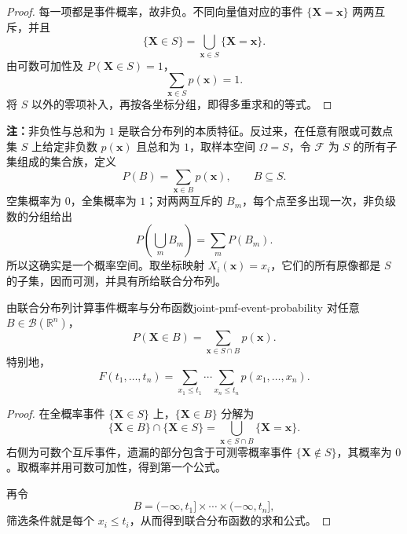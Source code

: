 \begin{proof}
每一项都是事件概率，故非负。不同向量值对应的事件 $\{\boldsymbol X=\boldsymbol x\}$ 两两互斥，并且
\[
\{\boldsymbol X\in S\}=\bigcup_{\boldsymbol x\in S}\{\boldsymbol X=\boldsymbol x\}.
\]
由可数可加性及 $P(\boldsymbol X\in S)=1$，
\[
\sum_{\boldsymbol x\in S}p(\boldsymbol x)=1.
\]
将 $S$ 以外的零项补入，再按各坐标分组，即得多重求和的等式。
\end{proof}

\textbf{注：}\quad 非负性与总和为 $1$ 是联合分布列的本质特征。反过来，在任意有限或可数点集 $S$ 上给定非负数 $p(\boldsymbol x)$ 且总和为 $1$，取样本空间 $\Omega=S$，令 $\mathcal F$ 为 $S$ 的所有子集组成的集合族，定义
\[
P(B)=\sum_{\boldsymbol x\in B}p(\boldsymbol x),\qquad B\subseteq S.
\]
空集概率为 $0$，全集概率为 $1$；对两两互斥的 $B_m$，每个点至多出现一次，非负级数的分组给出
\[
P\left(\bigcup_mB_m\right)=\sum_mP(B_m).
\]
所以这确实是一个概率空间。取坐标映射 $X_i(\boldsymbol x)=x_i$，它们的所有原像都是 $S$ 的子集，因而可测，并具有所给联合分布列。

\begin{proposition}{由联合分布列计算事件概率与分布函数}{joint-pmf-event-probability}
对任意 $B\in\mathcal B(\mathbb R^n)$，
\[
P(\boldsymbol X\in B)
=\sum_{\boldsymbol x\in S\cap B}p(\boldsymbol x).
\]
特别地，
\[
F(t_1,\ldots,t_n)
=\sum_{x_1\leq t_1}\cdots\sum_{x_n\leq t_n}
p(x_1,\ldots,x_n).
\]
\end{proposition}

\begin{proof}
在全概率事件 $\{\boldsymbol X\in S\}$ 上，$\{\boldsymbol X\in B\}$ 分解为
\[
\{\boldsymbol X\in B\}\cap\{\boldsymbol X\in S\}
=\bigcup_{\boldsymbol x\in S\cap B}\{\boldsymbol X=\boldsymbol x\}.
\]
右侧为可数个互斥事件，遗漏的部分包含于可测零概率事件 $\{\boldsymbol X\notin S\}$，其概率为 $0$。取概率并用可数可加性，得到第一个公式。

再令
\[
B=(-\infty,t_1]\times\cdots\times(-\infty,t_n],
\]
筛选条件就是每个 $x_i\leq t_i$，从而得到联合分布函数的求和公式。
\end{proof}

